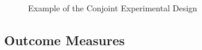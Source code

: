 \vspace{3mm}
\begin{figure}[H]
\caption{Example of the Conjoint Experimental Design}
\label{fig:art2-fig1}    
\end{figure}


\subsection{Outcome Measures}

